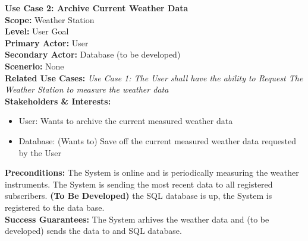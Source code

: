 \documentclass[letterpaper]{article}
\begin{document}
\noindent
\textbf{Use Case 2:  Archive Current Weather Data}\\
\textbf{Scope:  }Weather Station\\
\textbf{Level:  }User Goal\\
\textbf{Primary Actor: }User\\
\textbf{Secondary Actor:  }Database (to be developed)\\
\textbf{Scenerio:  }None\\
\textbf{Related Use Cases:  }\textit{Use Case 1:  The User shall have
the ability to Request The Weather Station to measure the weather
data}\\
\textbf{Stakeholders \& Interests:  }
\begin{itemize}
\item User:  Wants to archive the current measured weather data
\item Database:  (Wants to) Save off the current measured weather
data requested by the User
\end{itemize}
\textbf{Preconditions:  }The System is online and is periodically
measuring the weather instruments. The System is sending the most
recent data to all registered subscribers. \textbf{(To Be Developed)}
the SQL database is up, the System is registered to the data base.\\
\textbf{Success Guarantees:  }The System arhives the weather data and
(to be developed) sends the data to and SQL database.\\\\
\end{document}
